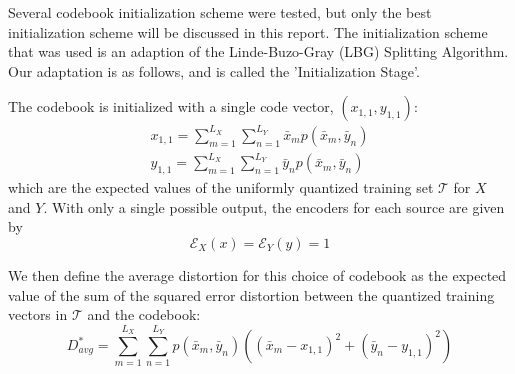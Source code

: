 \documentclass[10pt,twoside,titlepage]{article}
\begin{document}
Several codebook initialization scheme were tested, but only the best initialization scheme will be discussed in this report. The initialization scheme that was used is an adaption of the Linde-Buzo-Gray (LBG) Splitting Algorithm. Our adaptation is as follows, and is called the 'Initialization Stage'.

The codebook is initialized with a single code vector, $(x_{1,1},y_{1,1})$:
\begin{align}
    x_{1,1} = \sum_{m=1}^{L_X}\sum_{n=1}^{L_Y}\bar x_m p(\bar x_m, \bar y_n)\\
    y_{1,1} = \sum_{m=1}^{L_X}\sum_{n=1}^{L_Y}\bar y_n p(\bar x_m, \bar y_n)
\end{align}
which are the expected values of the uniformly quantized training set $\mathcal T$ for $X$ and $Y$. With only a single possible output, the encoders for each source are given by
\begin{equation}
    \mathcal E_X(x) = \mathcal E_Y(y) = 1
\end{equation}

We then define the average distortion for this choice of codebook as the expected value of the sum of the squared error distortion between the quantized training vectors in $\mathcal T$ and the codebook:
\begin{equation}
    D^*_{avg}=\sum_{m=1}^{L_X}\sum_{n=1}^{L_Y}p(\bar x_m,\bar y_n)\left((\bar x_m-x_{1,1})^2+(\bar y_n-y_{1,1})^2\right)
\end{equation}
\end{document}

